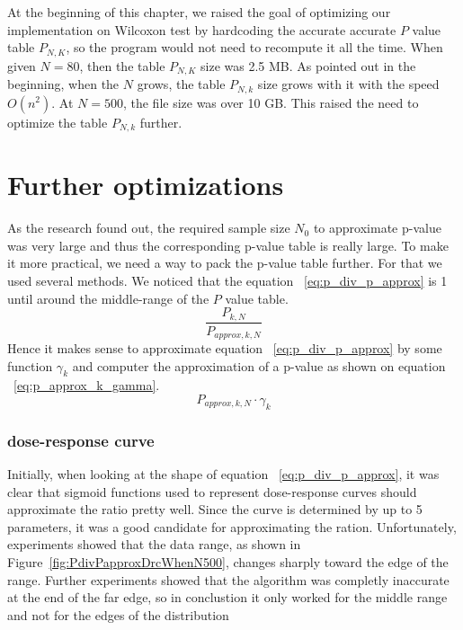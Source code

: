 \documentclass[12pt]{article}
\begin{document}
At the beginning of this chapter, we raised the goal of optimizing our implementation on Wilcoxon test by hardcoding the accurate accurate $P$ value table $P_{N, K}$, so the program would not need to recompute it all the time. When given $N = 80$, then the table $P_{N, K}$ size was 2.5 MB. As pointed out in the beginning, when the $N$ grows, the table $P_{N, k}$ size grows with it with the speed $O(n^2)$. At $N = 500$, the file size was over 10 GB. This raised the need to optimize the table $P_{N, k}$ further.

\section{Further optimizations}

As the research found out, the required sample size $N_0$ to approximate p-value was very large and thus the corresponding p-value table is really large. To make it more practical, we need a way to pack the p-value table further. For that we used several methods. We noticed that the equation ~\eqref{eq:p_div_p_approx} is 1 until around the middle-range of the $P$ value table.
\begin{equation}\label{eq:p_div_p_approx}
  \frac{P_{k, N}}{P_{approx, k, N}}
\end{equation}
Hence it makes sense to approximate equation ~\eqref{eq:p_div_p_approx} by some function $\gamma_k$ and computer the approximation of a p-value as shown on equation ~\eqref{eq:p_approx_k_gamma}.
\begin{equation}\label{eq:p_approx_k_gamma}
  P_{approx, k, N} \cdot \gamma_k
\end{equation}


\subsubsection{dose-response curve}
Initially, when looking at the shape of equation ~\eqref{eq:p_div_p_approx}, it was clear that sigmoid functions used to represent dose-response curves should approximate the ratio pretty well. Since the curve is determined by up to 5 parameters, it was a good candidate for approximating the ration. Unfortunately, experiments showed that the data range, as shown in Figure~\ref{fig:PdivPapproxDrcWhenN500}, changes sharply toward the edge of the range. Further experiments showed that the algorithm was completly inaccurate at the end of the far edge, so in conclustion it only worked for the middle range and not for the edges of the distribution
\end{document}
